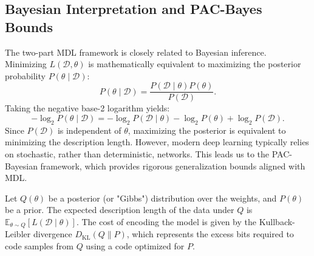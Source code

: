 \subsection{Bayesian Interpretation and PAC-Bayes Bounds}

The two-part MDL framework is closely related to Bayesian inference. Minimizing $L(\mathcal{D}, \theta)$ is mathematically equivalent to maximizing the posterior probability $P(\theta \mid \mathcal{D})$:
\begin{equation}
    P(\theta \mid \mathcal{D}) = \frac{P(\mathcal{D} \mid \theta) P(\theta)}{P(\mathcal{D})}.
\end{equation}
Taking the negative base-2 logarithm yields:
\begin{equation}
    -\log_2 P(\theta \mid \mathcal{D}) = -\log_2 P(\mathcal{D} \mid \theta) - \log_2 P(\theta) + \log_2 P(\mathcal{D}).
\end{equation}
Since $P(\mathcal{D})$ is independent of $\theta$, maximizing the posterior is equivalent to minimizing the description length. However, modern deep learning typically relies on stochastic, rather than deterministic, networks. This leads us to the PAC-Bayesian framework, which provides rigorous generalization bounds aligned with MDL.

Let $Q(\theta)$ be a posterior (or "Gibbs") distribution over the weights, and $P(\theta)$ be a prior. The expected description length of the data under $Q$ is $\mathbb{E}_{\theta \sim Q}[L(\mathcal{D} \mid \theta)]$. The cost of encoding the model is given by the Kullback-Leibler divergence $D_{\text{KL}}(Q \parallel P)$, which represents the excess bits required to code samples from $Q$ using a code optimized for $P$.

